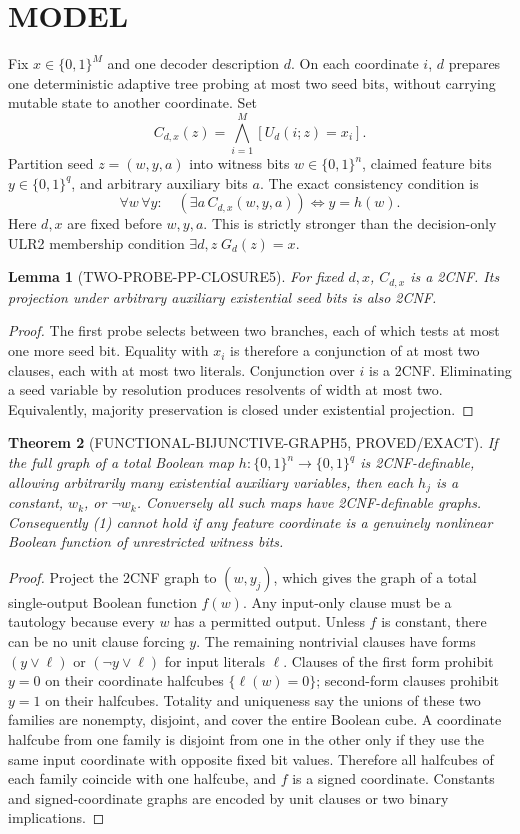 \documentclass[11pt]{article}
\newtheorem{theorem}{Theorem}
\newtheorem{lemma}[theorem]{Lemma}
\begin{document}
\section{MODEL}
Fix $x\in\{0,1\}^{M}$ and one decoder description $d$. On each coordinate $i$, $d$ prepares one deterministic adaptive tree probing at most two seed bits, without carrying mutable state to another coordinate. Set
\[
C_{d,x}(z)=\bigwedge_{i=1}^{M}[U_d(i;z)=x_i].
\]
Partition seed $z=(w,y,a)$ into witness bits $w\in\{0,1\}^n$, claimed feature bits $y\in\{0,1\}^q$, and arbitrary auxiliary bits $a$. The exact consistency condition is
\[
\forall w\,\forall y:\quad (\exists a\,C_{d,x}(w,y,a))\Longleftrightarrow y=h(w).
\tag{1}
\]
Here $d,x$ are fixed before $w,y,a$. This is strictly stronger than the decision-only ULR2 membership condition $\exists d,z\;G_d(z)=x$.

\begin{lemma}[TWO-PROBE-PP-CLOSURE5]
For fixed $d,x$, $C_{d,x}$ is a 2CNF. Its projection under arbitrary auxiliary existential seed bits is also 2CNF.
\end{lemma}
\begin{proof}
The first probe selects between two branches, each of which tests at most one more seed bit. Equality with $x_i$ is therefore a conjunction of at most two clauses, each with at most two literals. Conjunction over $i$ is a 2CNF. Eliminating a seed variable by resolution produces resolvents of width at most two. Equivalently, majority preservation is closed under existential projection.
\end{proof}

\begin{theorem}[FUNCTIONAL-BIJUNCTIVE-GRAPH5, PROVED/EXACT]
If the full graph of a total Boolean map $h:\{0,1\}^{n}\to\{0,1\}^{q}$ is 2CNF-definable, allowing arbitrarily many existential auxiliary variables, then each $h_j$ is a constant, $w_k$, or $\neg w_k$. Conversely all such maps have 2CNF-definable graphs. Consequently (1) cannot hold if any feature coordinate is a genuinely nonlinear Boolean function of unrestricted witness bits.
\end{theorem}
\begin{proof}
Project the 2CNF graph to $(w,y_j)$, which gives the graph of a total single-output Boolean function $f(w)$. Any input-only clause must be a tautology because every $w$ has a permitted output. Unless $f$ is constant, there can be no unit clause forcing $y$. The remaining nontrivial clauses have forms $(y\vee\ell)$ or $(\neg y\vee\ell)$ for input literals $\ell$. Clauses of the first form prohibit $y=0$ on their coordinate halfcubes $\{\ell(w)=0\}$; second-form clauses prohibit $y=1$ on their halfcubes. Totality and uniqueness say the unions of these two families are nonempty, disjoint, and cover the entire Boolean cube. A coordinate halfcube from one family is disjoint from one in the other only if they use the same input coordinate with opposite fixed bit values. Therefore all halfcubes of each family coincide with one halfcube, and $f$ is a signed coordinate. Constants and signed-coordinate graphs are encoded by unit clauses or two binary implications.
\end{proof}
\end{document}
